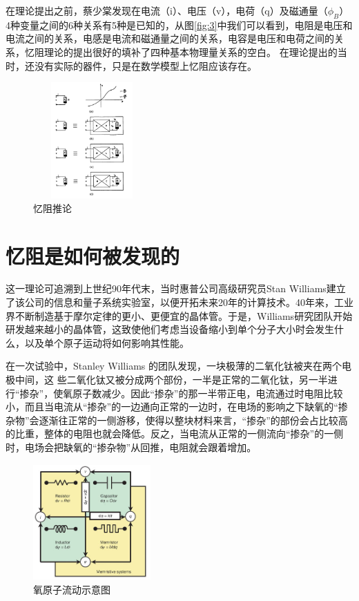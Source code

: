 \documentclass[UTF8]{article}
\begin{document}
在理论提出之前，蔡少棠发现在电流（i）、电压（v），电荷（q）及磁通量（$\phi_{B}$）4种变量之间的6种关系有5种是已知的，从图\eqref{fig:3}中我们可以看到，电阻是电压和电流之间的关系，电感是电流和磁通量之间的关系，电容是电压和电荷之间的关系，忆阻理论的提出很好的填补了四种基本物理量关系的空白。
在理论提出的当时，还没有实际的器件，只是在数学模型上忆阻应该存在。%

\begin{figure}[htbp]
\centering
\includegraphics[width=1.77in,height=1.75in]{pic/4}
\caption{忆阻推论}
\label{fig:4}
\end{figure}



\section{忆阻是如何被发现的}

这一理论可追溯到上世纪90年代末，当时惠普公司高级研究员Stan Williams建立了该公司的信息和量子系统实验室，以便开拓未来20年的计算技术。40年来，工业界不断制造基于摩尔定律的更小、更便宜的晶体管。于是，Williams研究团队开始研发越来越小的晶体管，这致使他们考虑当设备缩小到单个分子大小时会发生什么，以及单个原子运动将如何影响其性能。







在一次试验中，Stanley Williams 的团队发现，一块极薄的二氧化钛被夹在两个电极中间，这
些二氧化钛又被分成两个部份，一半是正常的二氧化钛，另一半进行“掺杂”，使氧原子数减少。因此“掺杂”的那一半带正电，电流通过时电阻比较小，而且当电流从“掺杂”的一边通向正常的一边时，在电场的影响之下缺氧的“掺杂物”会逐渐往正常的一侧游移，使得以整块材料来言，“掺杂”的部份会占比较高的比重，整体的电阻也就会降低。反之，当电流从正常的一侧流向“掺杂”的一侧时，电场会把缺氧的“掺杂物”从回推，电阻就会跟着增加。
\begin{figure}[htbp]
\centering
\includegraphics[width=1.77in,height=1.75in]{pic/memristor01.jpeg}

\caption{氧原子流动示意图}
\label{fig:graph}
\end{figure}
\end{document}
